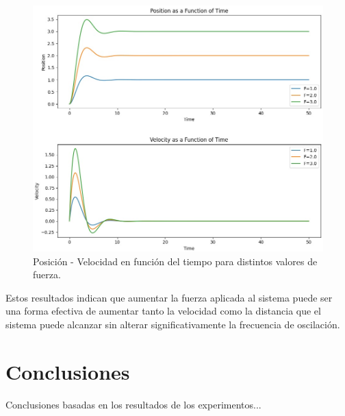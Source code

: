 \documentclass[]{article}
\begin{document}
\begin{figure}[H]
\centering
\includegraphics[width=\textwidth]{../assets/figure_1_force.jpeg}
\caption{Posición - Velocidad en función del tiempo para distintos valores de fuerza.}
\end{figure}

Estos resultados indican que aumentar la fuerza aplicada al sistema puede ser una forma efectiva de aumentar tanto la velocidad como la distancia que el sistema puede alcanzar sin alterar significativamente la frecuencia de oscilación.

\section{Conclusiones}
Conclusiones basadas en los resultados de los experimentos...
\end{document}
